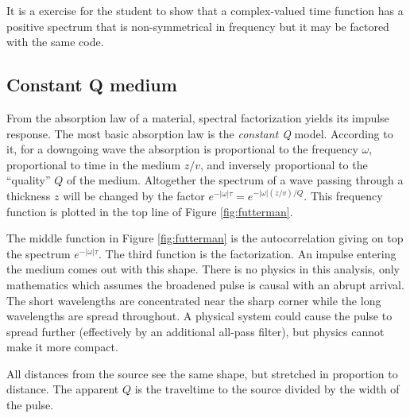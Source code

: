 \par
It is a exercise for the student to show that
a complex-valued time function has
a positive spectrum that is non-symmetrical in frequency
but it may be factored with the same code.

\subsection{Constant Q medium}
From the absorption law of a material, spectral factorization yields its impulse response.
The most basic absorption law is the {\em constant Q} model.
According to it, for a downgoing wave
the absorption is proportional to the frequency $\omega$,
proportional to time in the medium $z/v$,
and inversely proportional to the ``quality'' $Q$ of the medium.
Altogether the spectrum of a wave passing through a thickness $z$ will be changed by the factor
$ e^{-|\omega|\tau} = e^{-|\omega|(z/v)/Q} $.
This frequency function is plotted in the top line of Figure \ref{fig:futterman}.

\par

The middle function in Figure \ref{fig:futterman}
is the autocorrelation giving on top
the spectrum
$e^{-|\omega|\tau}$.
The third function is the factorization.
An impulse entering the medium comes out with this shape.
There is no physics in this analysis,
only mathematics which assumes the broadened pulse
is causal with an abrupt arrival.
The short wavelengths are concentrated near the sharp corner
while the long wavelengths are spread throughout.
A physical system could cause the pulse to spread further
(effectively by an additional all-pass filter),
but physics cannot make it more compact.
\par
All distances from the source see the same shape, but stretched
in proportion to distance.
The apparent $Q$ is
the traveltime to the source divided by the width of the pulse.


